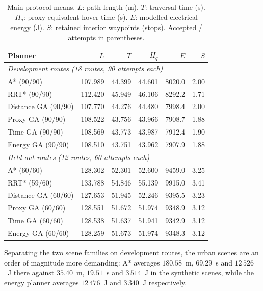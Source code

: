 \documentclass[conference]{IEEEtran}
\begin{document}
\begin{table}[t]
\caption{Main protocol means. $L$: path length (m). $T$: traversal time (s).
$H_q$: proxy equivalent hover time (s). $E$: modelled electrical energy (J).
$S$: retained interior waypoints (stops). Accepted / attempts in parentheses.}
\label{tab:main}
\centering
\small
\begin{tabular}{lrrrrr}
\toprule
Planner & $L$ & $T$ & $H_q$ & $E$ & $S$ \\
\midrule
\multicolumn{6}{l}{\textit{Development routes (18 routes, 90 attempts each)}}\\
A* (90/90)          & 107.989 & 44.399 & 44.601 & 8020.0 & 2.00 \\
RRT* (90/90)        & 112.420 & 45.949 & 46.106 & 8292.2 & 1.71 \\
Distance GA (90/90) & 107.770 & 44.276 & 44.480 & 7998.4 & 2.00 \\
Proxy GA (90/90)    & 108.522 & 43.756 & 43.966 & 7908.7 & 1.88 \\
Time GA (90/90)     & 108.569 & 43.773 & 43.987 & 7912.4 & 1.90 \\
Energy GA (90/90)   & 108.510 & 43.751 & 43.962 & 7907.9 & 1.88 \\
\midrule
\multicolumn{6}{l}{\textit{Held-out routes (12 routes, 60 attempts each)}}\\
A* (60/60)          & 128.302 & 52.301 & 52.600 & 9459.0 & 3.25 \\
RRT* (59/60)        & 133.788 & 54.846 & 55.139 & 9915.0 & 3.41 \\
Distance GA (60/60) & 127.653 & 51.945 & 52.246 & 9395.5 & 3.23 \\
Proxy GA (60/60)    & 128.551 & 51.672 & 51.974 & 9348.9 & 3.12 \\
Time GA (60/60)     & 128.538 & 51.637 & 51.941 & 9342.9 & 3.12 \\
Energy GA (60/60)   & 128.259 & 51.673 & 51.974 & 9348.3 & 3.12 \\
\bottomrule
\end{tabular}
\end{table}

Separating the two scene families on development routes, the urban scenes are an
order of magnitude more demanding: A* averages $180.58$~m, $69.29$~s and
$12\,526$~J there against $35.40$~m, $19.51$~s and $3\,514$~J in the synthetic
scenes, while the energy planner averages $12\,476$~J and $3\,340$~J
respectively.
\end{document}
